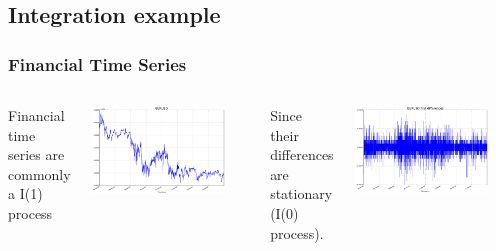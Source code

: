 \documentclass[compress,red]{beamer}
\begin{document}
\subsection{Integration example}
\begin{frame}
\frametitle{Financial Time Series}
\begin{columns}
\column[t]{5cm}
Financial time series are commonly a I(1) process 
\begin{center}
\includegraphics[width=0.85\textwidth]{img/EURUSD}
\end{center}
\column[t]{5cm}
Since their differences are stationary (I(0) process).
\begin{center}
\includegraphics[width=0.85\textwidth]{img/DEURUSD}
\end{center}
\end{columns}
\end{frame}
\end{document}
